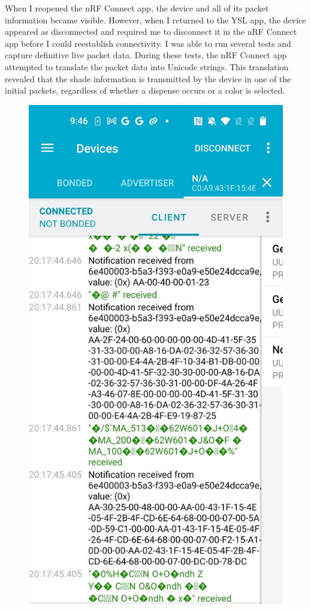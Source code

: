 When I reopened the nRF Connect app, the device and all of its packet information became visible. However, when I returned to the YSL app, the device appeared as disconnected and required me to disconnect it in the nRF Connect app before I could reestablish connectivity.
I was able to run several tests and capture definitive live packet data. During these tests, the nRF Connect app attempted to translate the packet data into Unicode strings. This translation revealed that the shade information is transmitted by the device in one of the initial packets, regardless of whether a dispense occurs or a color is selected.
\begin{figure}[H]
	\centering
	\includegraphics[scale=.15]{nrf_connect_android}
	\caption{}
	\label{fig:nrfconnectandroid}
\end{figure}

